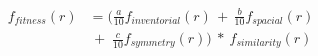 
\begin{equation} \label{p2eq:SiSyFitness}
\begin{split}
f_{fitness}(r) & = (\frac{a}{10}f_{inventorial}(r) \,+ \, \frac{b}{10}f_{spacial}(r) \\ 
 & \, + \; \frac{c}{10}f_{symmetry}(r)) \ * \ f_{similarity}(r)
\end{split}
\end{equation}